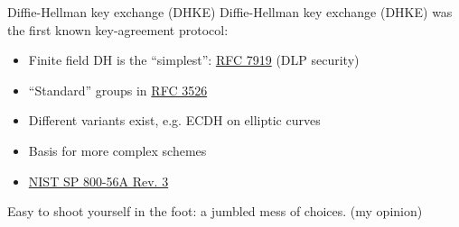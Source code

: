\begin{frame}{Diffie-Hellman key exchange (DHKE)}
  Diffie-Hellman key exchange (DHKE) was the first known key-agreement protocol:
  \begin{itemize}[<+(1)->]
    \item Finite field DH is the \enquote{simplest}: \href{https://datatracker.ietf.org/doc/html/rfc7919}{RFC 7919} (DLP security)
    \item \enquote{Standard} groups in \href{https://datatracker.ietf.org/doc/html/rfc3526}{RFC 3526}
    \item Different variants exist, e.g. ECDH on elliptic curves
    \item Basis for more complex schemes
    \item \href{https://csrc.nist.gov/pubs/sp/800/56/a/r3/final}{NIST SP 800-56A Rev. 3}
  \end{itemize}

  \pause
  Easy to shoot yourself in the foot: a jumbled mess of choices. (my opinion)
\end{frame}

